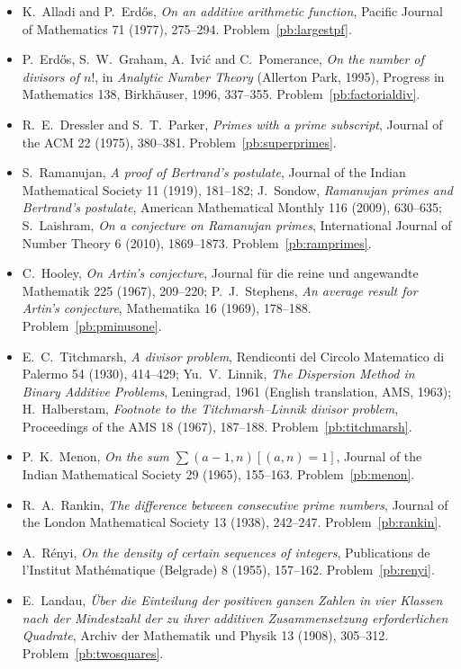 \begin{itemize}
\item K.~Alladi and P.~Erd\H os, \emph{On an additive arithmetic function}, Pacific Journal of Mathematics 71 (1977), 275--294. Problem~\ref{pb:largestpf}.
\item P.~Erd\H os, S.~W.~Graham, A.~Ivić and C.~Pomerance, \emph{On the number of divisors of $n!$}, in \emph{Analytic Number Theory} (Allerton Park, 1995), Progress in Mathematics 138, Birkhäuser, 1996, 337--355. Problem~\ref{pb:factorialdiv}.
\item R.~E.~Dressler and S.~T.~Parker, \emph{Primes with a prime subscript}, Journal of the ACM 22 (1975), 380--381. Problem~\ref{pb:superprimes}.
\item S.~Ramanujan, \emph{A proof of Bertrand's postulate}, Journal of the Indian Mathematical Society 11 (1919), 181--182; J.~Sondow, \emph{Ramanujan primes and Bertrand's postulate}, American Mathematical Monthly 116 (2009), 630--635; S.~Laishram, \emph{On a conjecture on Ramanujan primes}, International Journal of Number Theory 6 (2010), 1869--1873. Problem~\ref{pb:ramprimes}.
\item C.~Hooley, \emph{On Artin's conjecture}, Journal für die reine und angewandte Mathematik 225 (1967), 209--220; P.~J.~Stephens, \emph{An average result for Artin's conjecture}, Mathematika 16 (1969), 178--188. Problem~\ref{pb:pminusone}.
\item E.~C.~Titchmarsh, \emph{A divisor problem}, Rendiconti del Circolo Matematico di Palermo 54 (1930), 414--429; Yu.~V.~Linnik, \emph{The Dispersion Method in Binary Additive Problems}, Leningrad, 1961 (English translation, AMS, 1963); H.~Halberstam, \emph{Footnote to the Titchmarsh--Linnik divisor problem}, Proceedings of the AMS 18 (1967), 187--188. Problem~\ref{pb:titchmarsh}.
\item P.~K.~Menon, \emph{On the sum $\sum(a-1,n)[(a,n)=1]$}, Journal of the Indian Mathematical Society 29 (1965), 155--163. Problem~\ref{pb:menon}.
\item R.~A.~Rankin, \emph{The difference between consecutive prime numbers}, Journal of the London Mathematical Society 13 (1938), 242--247. Problem~\ref{pb:rankin}.
\item A.~Rényi, \emph{On the density of certain sequences of integers}, Publications de l'Institut Mathématique (Belgrade) 8 (1955), 157--162. Problem~\ref{pb:renyi}.
\item E.~Landau, \emph{Über die Einteilung der positiven ganzen Zahlen in vier Klassen nach der Mindestzahl der zu ihrer additiven Zusammensetzung erforderlichen Quadrate}, Archiv der Mathematik und Physik 13 (1908), 305--312. Problem~\ref{pb:twosquares}.

\end{itemize}
